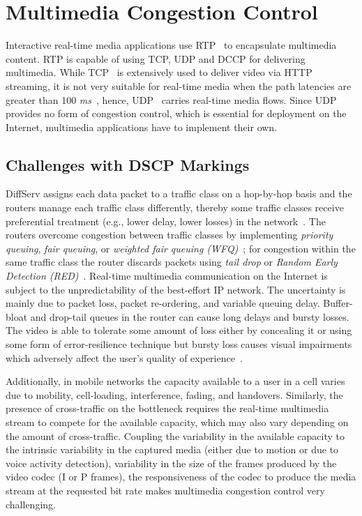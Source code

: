 
\section{Multimedia Congestion Control}

Interactive real-time media applications use RTP~\cite{rfc3550} to encapsulate
multimedia content. RTP is capable of using TCP, UDP and DCCP for delivering
multimedia.  While TCP~\cite{rfc793} is extensively used to deliver video via
HTTP streaming, it is not very suitable for real-time media when the path
latencies  are greater than 100 \emph{ms}~\cite{Brosh:tcp-real-time}, hence,
UDP~\cite{rfc768} carries real-time media flows. Since UDP provides no form of
congestion control, which is essential for deployment on the Internet,
multimedia applications have to implement their own. 


\subsection{Challenges with DSCP Markings}

DiffServ assigns each data packet to a traffic class on a hop-by-hop basis and
the routers manage each traffic class differently, thereby some traffic
classes receive preferential treatment (e.g., lower delay, lower losses) in
the network~\cite{rfc2475}. The routers overcome congestion between traffic
classes by implementing \emph{priority queuing}, \emph{fair queuing}, or
\emph{weighted fair queuing (WFQ)}~\cite{rfc4594}; for congestion within the
same traffic class the router discards packets using \emph{tail drop} or
\emph{Random Early Detection (RED)}~\cite{Floyd:RED}.
Real-time multimedia communication on the Internet is subject to the
unpredictability of the best-effort IP network. The uncertainty is mainly due
to packet loss, packet re-ordering, and variable queuing delay.  Buffer-bloat
\cite{gettys:bufferbloat} and drop-tail queues in the router  can cause long
delays and bursty losses. The video is able to tolerate some amount of loss
either by concealing it or using some form of error-resilience technique but
bursty loss causes visual impairments which adversely affect the user's
quality of experience~\cite{Zink03subjectiveimpression}.

Additionally, in mobile networks  the capacity available to a user in a cell
varies due to mobility, cell-loading, interference, fading, and handovers.
Similarly, the presence of cross-traffic on the bottleneck requires the real-time 
multimedia stream to compete for the available capacity, which may also
vary depending on the amount of cross-traffic.  Coupling the variability in
the available capacity to  the intrinsic variability in the captured media
(either due to motion or due  to voice activity detection), variability in the
size of the frames produced  by the video codec (I or P frames), the
responsiveness of the codec to produce the media stream at the requested bit
rate makes multimedia congestion control very challenging.

